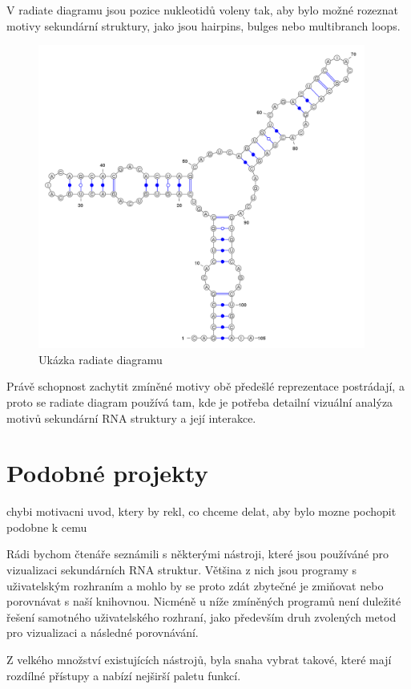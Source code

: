 V radiate diagramu jsou pozice nukleotidů voleny tak, aby bylo možné rozeznat
motivy sekundární struktury, jako jsou hairpins, bulges nebo multibranch loops. 

\begin{figure}[H]
  \centering
  \includegraphics[height=100mm]{../img/kap01/radiate.png}
  \caption{Ukázka radiate diagramu}
\end{figure}

Právě schopnost zachytit zmíněné motivy obě předešlé reprezentace postrádají, a
proto se radiate diagram používá tam, kde je potřeba detailní vizuální analýza
motivů sekundární RNA struktury a její interakce. 


\section{Podobné projekty} {\color{red} chybi motivacni uvod, ktery by rekl, co chceme delat, aby bylo mozne pochopit podobne k cemu}

Rádi bychom čtenáře seznámili s některými nástroji, které jsou používáné pro
vizualizaci sekundárních RNA struktur. Většina z nich jsou programy s
uživatelským rozhraním a mohlo by se proto zdát zbytečné je zmiňovat nebo
porovnávat s naší knihovnou. Nicméně u níže zmíněných programů není duležité
řešení samotného uživatelského rozhraní, jako především druh zvolených metod
pro vizualizaci a následné porovnávání.

Z velkého množství existujících nástrojů, byla snaha vybrat takové,
které mají rozdílné přístupy a nabízí nejširší paletu funkcí.


